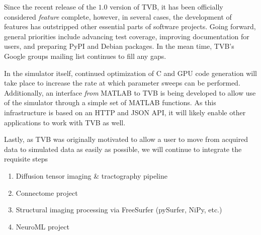 
Since the recent release of the $1.0$ version of TVB, it has been 
officially considered \textit{feature} complete, however, in several
cases, the development of features has outstripped other essential 
parts of software projects. Going forward, general priorities include
advancing test coverage, improving documentation for users, and
preparing PyPI and Debian packages. In the mean
time, TVB's Google groups mailing list continues to fill any gaps. 

In the simulator itself, continued optimization of C and GPU code generation
will take place to increase the rate at which parameter sweeps can be
performed. Additionally, an interface \textit{from} MATLAB to TVB 
is being developed to allow use of the simulator through a simple
set of MATLAB functions. As this infrastructure is based on an HTTP and 
JSON API, it will likely enable other applications to work with TVB as well.

Lastly, as TVB was originally motivated to allow a user to move from
acquired data to simulated data as easily as possible, we will continue
to integrate the requisite steps 

\begin{enumerate}
	\item Diffusion tensor imaging \& tractography pipeline
	\item Connectome project
	\item Structural imaging processing via FreeSurfer (pySurfer, NiPy, etc.)
	\item NeuroML project	
\end{enumerate}

